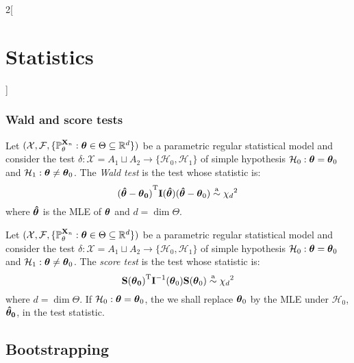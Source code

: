 \documentclass[../../../main.tex]{subfiles}
\begin{document}
\begin{multicols}{2}[\section{Statistics}]
  \subsubsection{Wald and score tests}
  \begin{definition}
    Let $(\mathcal{X},\mathcal{F},\{\mathbb{P}_\theta^{\boldsymbol{\mathrm{X}}_n}:\boldsymbol{\mathrm{\theta}}\in\Theta\subseteq\mathbb{R}^d\})$ be a parametric regular statistical model and consider the test $\delta:\mathcal{X}=A_1\sqcup A_2\rightarrow\{\mathcal{H}_0,\mathcal{H}_1\}$ of simple hypothesis $\mathcal{H}_0:\boldsymbol{\mathrm{\theta}}=\boldsymbol{\mathrm{\theta}}_0$ and $\mathcal{H}_1:\boldsymbol{\mathrm{\theta}}\ne\boldsymbol{\mathrm{\theta}}_0$. The \emph{Wald test} is the test whose statistic is: $$\vb{(\boldsymbol{\mathrm{\hat\theta}}-\boldsymbol{\mathrm{\theta}}_0)}^{\mathrm{T}}\boldsymbol{\mathrm{I}}(\boldsymbol{\mathrm{\hat\theta}})(\boldsymbol{\mathrm{\hat\theta}}-\boldsymbol{\mathrm{\theta}}_0)\overset{\text{a}}{\sim}{\chi_d}^2$$ where $\boldsymbol{\mathrm{\hat\theta}}$ is the MLE of $\boldsymbol{\mathrm{\theta}}$ and $d=\dim\Theta$.
  \end{definition}
  \begin{definition}
    Let $(\mathcal{X},\mathcal{F},\{\mathbb{P}_\theta^{\boldsymbol{\mathrm{X}}_n}:\boldsymbol{\mathrm{\theta}}\in\Theta\subseteq\mathbb{R}^d\})$ be a parametric regular statistical model and consider the test $\delta:\mathcal{X}=A_1\sqcup A_2\rightarrow\{\mathcal{H}_0,\mathcal{H}_1\}$ of simple hypothesis $\mathcal{H}_0:\boldsymbol{\mathrm{\theta}}=\boldsymbol{\mathrm{\theta}}_0$ and $\mathcal{H}_1:\boldsymbol{\mathrm{\theta}}\ne\boldsymbol{\mathrm{\theta}}_0$. The \emph{score test} is the test whose statistic is: $$\vb{\boldsymbol{\mathrm{S}}(\boldsymbol{\mathrm{\theta}}_0)}^{\mathrm{T}}\boldsymbol{\mathrm{I}}^{-1}(\boldsymbol{\mathrm{\theta}}_0)\boldsymbol{\mathrm{S}}(\boldsymbol{\mathrm{\theta}}_0)\overset{\text{a}}{\sim}{\chi_d}^2$$ where $d=\dim\Theta$. If $\mathcal{H}_0:\boldsymbol{\mathrm{\theta}}=\boldsymbol{\mathrm{\theta}}_0$, the we shall replace $\boldsymbol{\mathrm{\theta}}_0$ by the MLE under $\mathcal{H}_0$, $\boldsymbol{\mathrm{\hat\theta_0}}$, in the test statistic.
  \end{definition}
  \subsection{Bootstrapping}

\end{multicols}
\end{document}
